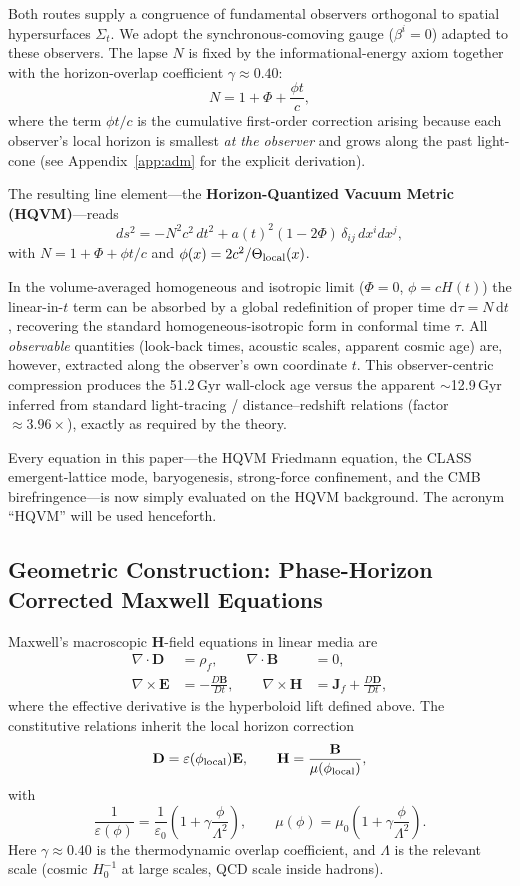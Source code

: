 \documentclass[12pt,a4paper]{article}
\begin{document}
Both routes supply a congruence of fundamental observers orthogonal to spatial hypersurfaces $\Sigma_t$. We adopt the synchronous-comoving gauge ($\beta^i=0$) adapted to these observers. The lapse $N$ is fixed by the informational-energy axiom together with the horizon-overlap coefficient $\gamma\approx0.40$:
\[
N=1+\Phi+\frac{\phi t}{c},
\]
where the term $\phi t/c$ is the cumulative first-order correction arising because each observer's local horizon is smallest {\it at the observer} and grows along the past light-cone (see Appendix~\ref{app:adm} for the explicit derivation).

The resulting line element---the {\bfseries Horizon-Quantized Vacuum Metric (HQVM)}---reads
\[
ds^2 = -N^2 c^2\,dt^2 + a(t)^2(1-2\Phi)\,\delta_{ij}\,dx^i dx^j,
\]
with $N=1+\Phi+\phi t/c$ and $\phi(x)=2c^2/\Theta_{\rm local}(x)$.

In the volume-averaged homogeneous and isotropic limit ($\Phi=0$, $\phi=cH(t)$) the linear-in-$t$ term can be absorbed by a global redefinition of proper time $\mathrm{d}\tau=N\,\mathrm{d}t$, recovering the standard homogeneous-isotropic form in conformal time $\tau$. All {\it observable} quantities (look-back times, acoustic scales, apparent cosmic age) are, however, extracted along the observer's own coordinate $t$. This observer-centric compression produces the 51.2\,Gyr wall-clock age versus the apparent $\sim$12.9\,Gyr inferred from standard light-tracing / distance--redshift relations (factor $\approx3.96\times$), exactly as required by the theory.

Every equation in this paper---the HQVM Friedmann equation, the CLASS emergent-lattice mode, baryogenesis, strong-force confinement, and the CMB birefringence---is now simply evaluated on the HQVM background. The acronym ``HQVM'' will be used henceforth.

\subsection{Geometric Construction: Phase-Horizon Corrected Maxwell Equations}

Maxwell's macroscopic $\mathbf{H}$-field equations in linear media are
\begin{align}
\nabla \cdot \mathbf{D} &= \rho_f, \qquad
\nabla \cdot \mathbf{B} &= 0, \\
\nabla \times \mathbf{E} &= -\frac{D\mathbf{B}}{Dt}, \qquad
\nabla \times \mathbf{H} &= \mathbf{J}_f + \frac{D\mathbf{D}}{Dt},
\end{align}
where the effective derivative is the hyperboloid lift defined above. The constitutive relations inherit the local horizon correction
\[
\mathbf{D} = \varepsilon(\phi_{\rm local})\mathbf{E}, \qquad
\mathbf{H} = \frac{\mathbf{B}}{\mu(\phi_{\rm local})},
\]
with
\[
\frac{1}{\varepsilon(\phi)} = \frac{1}{\varepsilon_0}\left(1 + \gamma \frac{\phi}{\Lambda^2}\right), \qquad
\mu(\phi) = \mu_0\left(1 + \gamma \frac{\phi}{\Lambda^2}\right).
\]
Here $\gamma\approx0.40$ is the thermodynamic overlap coefficient, and $\Lambda$ is the relevant scale (cosmic $H_0^{-1}$ at large scales, QCD scale inside hadrons).
\end{document}
